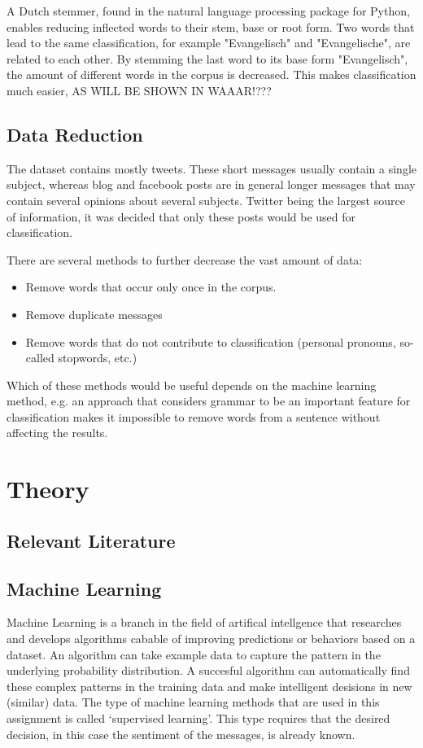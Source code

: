 \documentclass[11pt]{article}
\begin{document}
A Dutch stemmer, found in the natural language processing package for Python, enables reducing inflected words to their stem, base or root form. Two words that lead to the same classification, for example "Evangelisch" and "Evangelische", are related to each other. By stemming the last word to its base form "Evangelisch", the amount of different words in the corpus is decreased. This makes classification much easier, AS WILL BE SHOWN IN WAAAR!???

\subsection{Data Reduction}
The dataset contains mostly tweets. These short messages usually contain a single subject, whereas blog and facebook posts are in general longer messages that may contain several opinions about several subjects. Twitter being the largest source of information, it was decided that only these posts would be used for classification. 

There are several methods to further decrease the vast amount of data:
\begin{itemize}
\item Remove words that occur only once in the corpus.
\item Remove duplicate messages
\item Remove words that do not contribute to classification (personal pronouns, so-called stopwords, etc.)
\end{itemize}
Which of these methods would be useful depends on the machine learning method, e.g. an approach that considers grammar to be an important feature for classification makes it impossible to remove words from a sentence without affecting the results.

\section{Theory}
\subsection{Relevant Literature}

\subsection{Machine Learning} 
Machine Learning is a branch in the field of artifical intellgence that researches and develops algorithms cabable of improving predictions or behaviors based on a dataset. An algorithm can take example data to capture the pattern in the underlying probability distribution. A succesful algorithm can automatically find these complex patterns in the training data and make intelligent desisions in new (similar) data. The type of machine learning methods that are used in this assignment is called `supervised learning'. This type requires that the desired decision, in this case the sentiment of the messages, is already known.  
\end{document}
